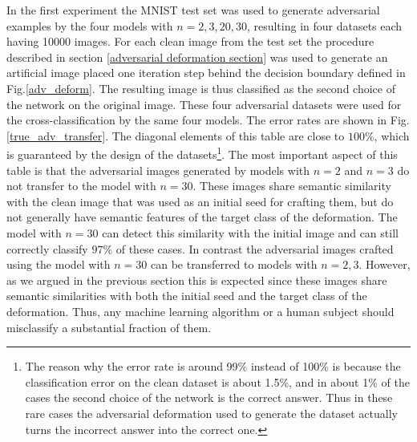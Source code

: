\documentclass[12pt]{article} %
\begin{document}
In the first experiment the MNIST test set was used to generate adversarial examples by the four models with $n=2, 3, 20, 30$, resulting in four datasets each having 10000 images. For each clean image from the test set the procedure described in section \ref{adversarial deformation section} was used to generate an artificial image placed one iteration step behind the decision boundary defined in Fig.\ref{adv_deform}. The resulting image is thus classified as the second choice of the network on the original image. These four adversarial datasets were used for the cross-classification by the same four models. The error rates are shown in Fig.\ref{true_adv_transfer}. The diagonal elements of this table are close to $100\%$, which is guaranteed by the design of the datasets\footnote{The reason why the error rate is around 99\% instead of 100\% is because the classification error on the clean dataset is about 1.5\%, and in about 1\% of the cases the second choice of the network is the correct answer. Thus in these rare cases the adversarial deformation used to generate the dataset actually turns the incorrect answer into the correct one.}.  The most important aspect of this table is that the adversarial images generated by models with $n=2$ and $n=3$ do not transfer to the model with $n=30$. These images share semantic similarity with the clean image that was used as an initial seed for crafting them, but do not generally have semantic features of the target class of the deformation. The model with $n=30$ can detect this similarity with the initial image and can still correctly classify $97\%$ of these cases. In contrast the adversarial images crafted using the model with $n=30$ can be transferred to models with $n=2, 3$. However, as we argued in the previous section this is expected since these images share semantic similarities with both the initial seed and the target class of the deformation. Thus, any machine learning algorithm or a human subject should misclassify a substantial fraction of them.
\end{document}
